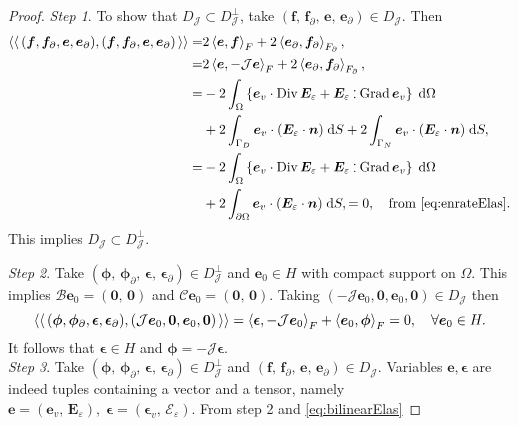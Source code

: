 \begin{theorem}
\begin{proof}
\textit{Step 1}. To show that ${D}_{\mathcal{J}} \subset {D}_{\mathcal{J}}^\perp$, take $(\bm{f}, \, \bm{f}_\partial, \, \bm{e}, \, \bm{e}_\partial) \in {D}_{\mathcal{J}}$. Then
\begin{align*}
\bilprod{(\bm{f}, \bm{f}_{\partial}, \bm{e}, \bm{e}_{\partial})}{(\bm{f}, \bm{f}_{\partial}, \bm{e}, \bm{e}_{\partial})} =& 2 \inner[F]{\bm{e}}{\bm{f}} + 2 \inner[F_\partial]{\bm{e}_{\partial}}{\bm{f}_{\partial}}, \\
=& 2 \inner[F]{\bm{e}}{-\mathcal{J}\bm{e}} + 2 \inner[F_\partial]{\bm{e}_{\partial}}{\bm{f}_{\partial}}, \\
=& - 2 \int_{\Omega} \left\{\bm{e}_v \cdot \Div \bm{E}_\varepsilon + \bm{E}_\varepsilon \cddot \Grad \bm{e}_v \right\}\d\Omega\\
&+ 2 \int_{\Gamma_D} \bm{e}_v \cdot (\bm{E}_\varepsilon\cdot\bm{n}) \d{S} + 2 \int_{\Gamma_N} \bm{e}_v \cdot (\bm{E}_\varepsilon\cdot\bm{n}) \d{S}, \\
=& - 2 \int_{\Omega} \left\{\bm{e}_v \cdot \Div \bm{E}_\varepsilon + \bm{E}_\varepsilon \cddot \Grad \bm{e}_v \right\}\d\Omega\\
&+ 2 \int_{\partial\Omega} \bm{e}_v \cdot (\bm{E}_\varepsilon\cdot\bm{n}) \d{S},
= 0, \quad \text{from \eqref{eq:enrateElas}}.
\end{align*}
This implies ${D}_{\mathcal{J}} \subset {D}_{\mathcal{J}}^\perp$.

\textit{Step 2}. Take $(\bm{\phi}, \, \bm{\phi}_\partial, \, \bm{\epsilon}, \, \bm{\epsilon}_\partial) \in {D}_{\mathcal{J}}^\perp$ and $\bm{e}_0 \in H$ with compact support on $\Omega$. This implies $\mathcal{B}\bm{e}_0 = (\bm{0},\, \bm{0})$ and $\mathcal{C}\bm{e}_0 = (\bm{0},\, \bm{0})$. Taking $(-\mathcal{J}\bm{e}_0, \bm{0}, \bm{e}_0, \bm{0}) \in {D}_{\mathcal{J}}$ then 
\[
\bilprod{(\bm{\phi}, \bm{\phi}_\partial,  \bm{\epsilon}, \bm{\epsilon}_\partial)}{(\mathcal{J}\bm{e}_0, \bm{0}, \bm{e}_0, \bm{0})} = \inner[F]{\bm{\epsilon}}{-\mathcal{J}\bm{e}_0} + \inner[F]{\bm{e}_0}{\bm{\phi}} = 0, \quad \forall \bm{e}_0 \in H.
\]
It follows that $\bm{\epsilon} \in H$ and $\bm{\phi}=-\mathcal{J}\bm{\epsilon}$. \\

\textit{Step 3}. Take $(\bm{\phi}, \, \bm{\phi}_\partial, \, \bm{\epsilon}, \, \bm{\epsilon}_\partial) \in {D}_{\mathcal{J}}^\perp$ and $(\bm{f}, \, \bm{f}_\partial, \, \bm{e}, \, \bm{e}_\partial) \in {D}_{\mathcal{J}}$. Variables $\bm{e}, \bm{\epsilon}$ are indeed tuples containing a vector and a tensor, namely $\bm{e} = (\bm{e}_v, \, \bm{E}_\varepsilon), \;\bm{\epsilon} = (\bm{\epsilon}_v, \, \bm{\mathcal{E}}_\varepsilon)$. From step 2 and \eqref{eq:bilinearElas}


\end{proof}
\end{theorem}
